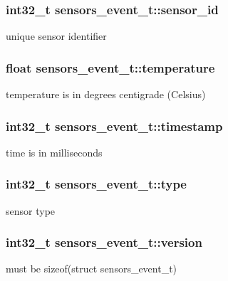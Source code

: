 \subsubsection[{\texorpdfstring{sensor\+\_\+id}{sensor_id}}]{\setlength{\rightskip}{0pt plus 5cm}int32\+\_\+t sensors\+\_\+event\+\_\+t\+::sensor\+\_\+id}\hypertarget{structsensors__event__t_a6b06d35b17afbee79de7f45d9d71ed0b}{}\label{structsensors__event__t_a6b06d35b17afbee79de7f45d9d71ed0b}
unique sensor identifier 
\subsubsection[{\texorpdfstring{temperature}{temperature}}]{\setlength{\rightskip}{0pt plus 5cm}float sensors\+\_\+event\+\_\+t\+::temperature}\hypertarget{structsensors__event__t_a914f76beb75bd99aa3c13d3a8e56e21c}{}\label{structsensors__event__t_a914f76beb75bd99aa3c13d3a8e56e21c}
temperature is in degrees centigrade (Celsius) 
\subsubsection[{\texorpdfstring{timestamp}{timestamp}}]{\setlength{\rightskip}{0pt plus 5cm}int32\+\_\+t sensors\+\_\+event\+\_\+t\+::timestamp}\hypertarget{structsensors__event__t_acd3be1560458b3e3bf52f93f744e8238}{}\label{structsensors__event__t_acd3be1560458b3e3bf52f93f744e8238}
time is in milliseconds 
\subsubsection[{\texorpdfstring{type}{type}}]{\setlength{\rightskip}{0pt plus 5cm}int32\+\_\+t sensors\+\_\+event\+\_\+t\+::type}\hypertarget{structsensors__event__t_a58401dd7f3400d9eb96c71b8fba9f8e8}{}\label{structsensors__event__t_a58401dd7f3400d9eb96c71b8fba9f8e8}
sensor type 
\subsubsection[{\texorpdfstring{version}{version}}]{\setlength{\rightskip}{0pt plus 5cm}int32\+\_\+t sensors\+\_\+event\+\_\+t\+::version}\hypertarget{structsensors__event__t_a2134d60fdb21e3495c595a2df2f5cece}{}\label{structsensors__event__t_a2134d60fdb21e3495c595a2df2f5cece}
must be sizeof(struct sensors\+\_\+event\+\_\+t) 
